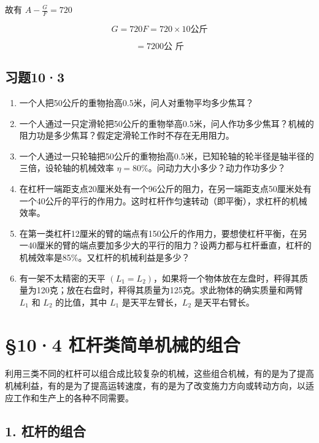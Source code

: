 故有 \(A - \frac{G}{F} = 720\)

\[
G = 720 F = 720 \times 10 \text{公斤}
\]

\[
= 7200 \text{公 斤}
\]

\subsection{习题10·3}\label{ux4e60ux9898103}

\begin{enumerate}
\def\labelenumi{\arabic{enumi}.}
\item
  一个人把50公斤的重物抬高0.5米，问人对重物平均多少焦耳？
\item
  一个人通过一只定滑轮把50公斤的重物举高0.5米，问人作功多少焦耳？机械的阻力功是多少焦耳？假定定滑轮工作时不存在无用阻力。
\item
  一个人通过一只轮轴把50公斤的重物抬高0.5米，已知轮轴的轮半径是轴半径的三倍，设轮轴的机械效率
  \(\eta=80\%\)。问动力大小多少？动力作功多少？
\item
  在杠杆一端距支点20厘米处有一个96公斤的阻力，在另一端距支点50厘米处有一个40公斤的平行的作用力。这时杠杆作匀速转动（即平衡），求杠杆的机械效率。
\item
  在第一类杠杆12厘米的臂的端点有150公斤的作用力，要想使杠杆平衡，在另一40厘米的臂的端点要加多少大的平行的阻力？设两力都与杠杆垂直，杠杆的机械效率是85\%。又杠杆的机械利益是多少？
\item
  有一架不太精密的天平
  \((L_{1} = L_{2})\)，如果将一个物体放在左盘时，秤得其质量为120克；放在右盘时，秤得其质量为125克。求此物体的确实质量和两臂
  \(L_{1}\) 和 \(L_{2}\) 的比值，其中 \(L_{1}\) 是天平左臂长，\(L_{2}\)
  是天平右臂长。
\end{enumerate}

\section{§10·4
杠杆类简单机械的组合}\label{ux6760ux6746ux7c7bux7b80ux5355ux673aux68b0ux7684ux7ec4ux5408}

利用三类不同的杠杆可以组合成比较复杂的机械，这些组合机械，有的是为了提高机械利益，有的是为了提高运转速度，有的是为了改变施力方向或转动方向，以适应工作和生产上的各种不同需要。

\subsection{1. 杠杆的组合}\label{ux6760ux6746ux7684ux7ec4ux5408}

